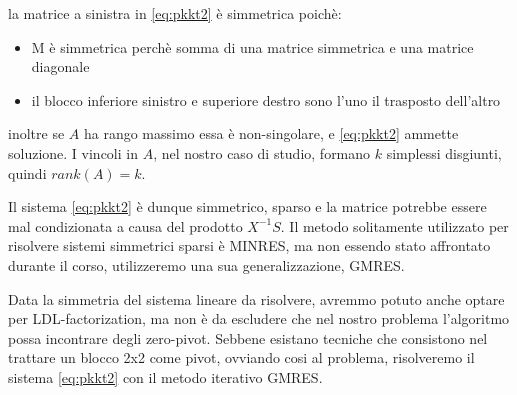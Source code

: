 la matrice a sinistra in \ref{eq:pkkt2} è simmetrica poichè:
\begin{itemize}
    \item M è simmetrica perchè somma di una matrice simmetrica e una matrice diagonale
    \item il blocco inferiore sinistro e superiore destro sono l'uno il trasposto dell'altro
\end{itemize}
inoltre se $A$ ha rango massimo essa è non-singolare, e \ref{eq:pkkt2} ammette soluzione. I vincoli in $A$, nel nostro caso di studio, formano $k$ simplessi disgiunti, quindi $rank(A)=k$.


Il sistema \ref{eq:pkkt2} è dunque simmetrico, sparso e la matrice potrebbe essere mal condizionata a causa del prodotto $X^{-1}S$. Il metodo solitamente 
utilizzato per risolvere sistemi simmetrici sparsi è MINRES, ma non essendo stato affrontato durante il corso, utilizzeremo una sua generalizzazione, GMRES.

Data la simmetria del sistema lineare da risolvere, avremmo potuto anche optare per LDL-factorization, ma non è da escludere che nel nostro problema l'algoritmo possa incontrare degli zero-pivot. Sebbene esistano tecniche che consistono nel trattare un blocco 2x2 come pivot, ovviando cosi al problema, risolveremo il sistema \ref{eq:pkkt2} con il metodo iterativo GMRES. 